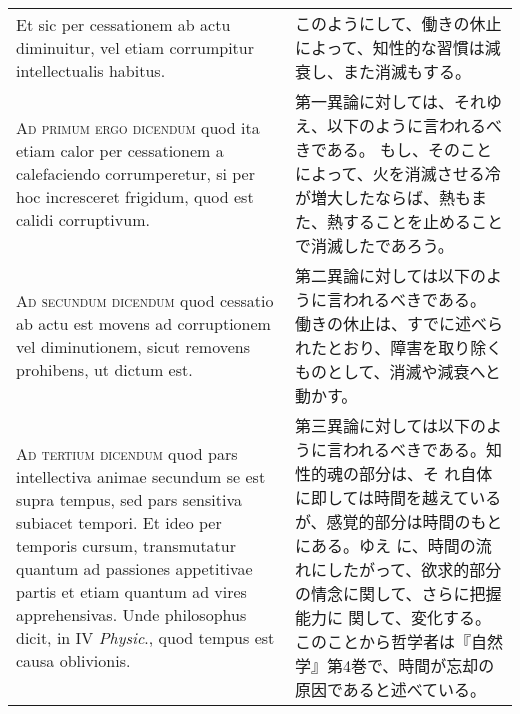 \documentclass[10pt]{jsarticle} %
\begin{document}
\begin{longtable}{p{21em}p{21em}}
\\


Et sic per cessationem
ab actu diminuitur, vel etiam corrumpitur intellectualis habitus.

&

このようにして、働きの休止によって、知性的な習慣は減衰し、また消滅もする。


\\





{\scshape Ad primum ergo dicendum} quod ita etiam calor per cessationem a
calefaciendo corrumperetur, si per hoc incresceret frigidum, quod est
calidi corruptivum.

&


第一異論に対しては、それゆえ、以下のように言われるべきである。
もし、そのことによって、火を消滅させる冷が増大したならば、熱もまた、熱することを止めることで消滅したであろう。

\\



{\scshape Ad secundum dicendum} quod cessatio ab actu est movens ad corruptionem
vel diminutionem, sicut removens prohibens, ut dictum est.

&

第二異論に対しては以下のように言われるべきである。
働きの休止は、すでに述べられたとおり、障害を取り除くものとして、消滅や減衰へと動かす。

\\



{\scshape Ad tertium dicendum} quod pars intellectiva animae secundum se est
supra tempus, sed pars sensitiva subiacet tempori. Et ideo per
temporis cursum, transmutatur quantum ad passiones appetitivae partis
et etiam quantum ad vires apprehensivas. Unde philosophus dicit, in IV
{\itshape Physic}., quod tempus est causa oblivionis.

&

第三異論に対しては以下のように言われるべきである。知性的魂の部分は、そ
れ自体に即しては時間を越えているが、感覚的部分は時間のもとにある。ゆえ
に、時間の流れにしたがって、欲求的部分の情念に関して、さらに把握能力に
関して、変化する。このことから哲学者は『自然学』第4巻で、時間が忘却の
原因であると述べている。

\end{longtable}
\end{document}
